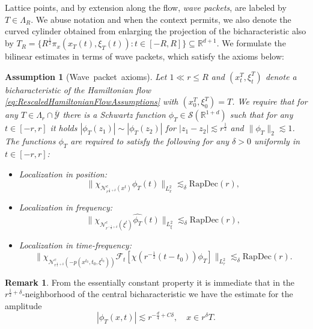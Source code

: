 \documentclass{amsart}
\newtheorem{assumption}[theorem]{Assumption}
\theoremstyle{definition}
\newtheorem{remark}[theorem]{Remark}
\newcommand{\R}{\mathbb{R}}
\begin{document}
Lattice points, and by extension along the flow, \emph{wave packets},  are labeled by $T \in \Lambda_R$. We abuse notation and when the context permits, we also denote the curved cylinder obtained from enlarging the projection of the bicharacteristic also by $T_R =
\{ R^{\frac{1}{2}} \pi_x(x_T(t),\xi_T(t)) : t \in [-R,R] \} \subseteq \R^{d+1} $. We formulate the bilinear estimates in terms of wave packets, which satisfy the axioms below:
\begin{assumption}[Wave~packet~axioms]
\label{ass:WP}
Let $1 \ll r \leq R$ and $(x^T_t,\xi^T_t)$ denote a bicharacteristic of the Hamiltonian flow \eqref{eq:RescaledHamiltonianFlowAssumptions} with $(x_0^T,\xi_0^T) = T$. We require that for any $T \in \Lambda_r \cap \overline{\mathcal{Y}}$ there is a Schwartz function $\phi_T \in \mathcal{S}(\R^{1+d})$ such that for any $t \in [-r,r]$ it holds $|\phi_T(z_1)| \sim |\phi_T(z_2)|$ for $|z_1 - z_2| \lesssim r^{\frac{1}{2}}$ and $\| \phi_T \|_2 \lesssim 1$.
The functions $\phi_T$ are required to satisfy the following for any $\delta > 0$ uniformly in $t \in [-r,r]$:
\begin{itemize}
\item[1.] \emph{Localization in position:} 
\begin{equation*}
\| \chi_{\mathcal{N}^c_{r^{\frac{1}{2}+\delta}}(x^t)} \phi_T(t) \|_{L^2_x} \lesssim_{\delta} \text{RapDec}(r),
\end{equation*}
\item[2.] \emph{Localization in frequency:}
\begin{equation*}
 \| \chi_{\mathcal{N}^c_{r^{-\frac{1}{2}+\delta}}(\xi^t)} \widehat{\phi_T}(t) \|_{L^2_{\xi}} \lesssim_{\delta} \text{RapDec}(r),
\end{equation*}
\item[3.] \emph{Localization in time-frequency:} 
\begin{equation*}
\| \chi_{\mathcal{N}^c_{r^{\frac{1}{2}+\delta}}(-p(x^{t_0},t_0,\xi^{t_0}))} \mathcal{F}_t [ \chi(r^{-\frac{1}{2}} (t-t_0)) \phi_T ] \|_{L^2_{\tau}} \lesssim_{\delta} \text{RapDec}(r).
\end{equation*}
\end{itemize}
\end{assumption}

\begin{remark}
From the essentially constant property it is immediate that in the $r^{\frac{1}{2}+\delta}$-neighborhood of the central bicharacteristic we have the estimate for the amplitude
\begin{equation}
\label{eq:AmplitudeSize}
|\phi_T(x,t)| \lesssim r^{-\frac{d}{4}+ C \delta}, \quad x \in r^{\delta} T.
\end{equation}
\end{remark}
\end{document}
